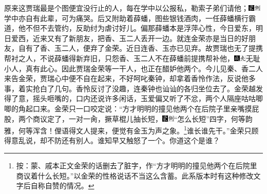 原来这贾瑞最是个图便宜没行止的人，每在学中以公报私，勒索子弟们请他；{\includegraphics[width=3mm]{../Images/00006}\includegraphics[width=3mm]{../Images/00011}\footnotesize \kaishu 学中亦自有此辈，可为痛哭。}后又附助着薛蟠，图些银钱酒肉，一任薛蟠横行霸道，他不但不去管约，反助纣为虐讨好儿。偏那薛蟠本是浮萍心性，今日爱东，明日爱西，近来又有了新朋友，把香、玉二人丢开一边。就连金荣亦是当日的好朋友，自有了香、玉二人，便弃了金荣。近日连香、玉亦已见弃。故贾瑞也无了提携帮衬之人，不说薛蟠得新弃旧，只怨香、玉二人不在薛蟠前提携帮补他，{\includegraphics[width=3mm]{../Images/00005}\includegraphics[width=3mm]{../Images/00012}\footnotesize \kaishu 无耻小人，真有此心。}因此贾瑞金荣等一干人，也正在醋妒他两个。今儿见秦、香二人来告金荣，贾瑞心中便不自在起来，不好呵叱秦钟，却拿着香怜作法，反说他多事，着实抢白了几句。香怜反讨了没趣，连秦钟也讪讪的各归坐位去了。金荣越发得了意，摇头咂嘴的，口内还说许多闲话，玉爱偏又听了不忿，两个人隔座咕咕唧唧的角起口来。金荣只一口咬定说：“方才明明的撞见他两个在后院子里亲嘴摸屁股，两个商议定了，一对一肏，撅草棍儿抽长短，{\includegraphics[width=3mm]{../Images/00006}\includegraphics[width=3mm]{../Images/00011}\footnotesize \kaishu “怎么长短”四字，何等韵雅，何等浑含！俚语得文人提来，便觉有金玉为声之象。}\footnote{按：蒙、戚本正文金荣的话删去了脏字，作“方才明明的撞见他两个在后院里商议着什么长短。”以金荣的性格说话不当这么含蓄。此系版本时有这种修改文字后自称自赞的情况。}谁长谁先干。”金荣只顾得意乱说，却不防还有别人。谁知早又触怒了一个。你道这个是谁？

